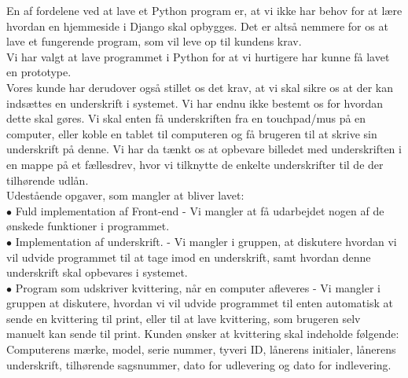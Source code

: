 \documentclass[a4paper]{article}
\begin{document}
En af fordelene ved at lave et Python program er, at vi ikke har behov for at lære hvordan en hjemmeside i Django skal opbygges. Det er altså nemmere for os at lave et fungerende program, som vil leve op til kundens krav. \\
Vi har valgt at lave programmet i Python for at vi hurtigere har kunne få lavet en prototype. \\
Vores kunde har derudover også stillet os det krav, at vi skal sikre os at der kan indsættes en underskrift i systemet. Vi har endnu ikke bestemt os for hvordan dette skal gøres. Vi skal enten få underskriften fra en touchpad/mus på en computer, eller koble en tablet til computeren og få brugeren til at skrive sin underskrift på denne. Vi har da tænkt os at opbevare billedet med underskriften i en mappe på et fællesdrev, hvor vi tilknytte de enkelte underskrifter til de der tilhørende udlån. \\[0.1in]
Udestående opgaver, som mangler at bliver lavet: \\
$\bullet$ Fuld implementation af Front-end - Vi mangler at få udarbejdet nogen af de ønskede funktioner i programmet. \\
$\bullet$ Implementation af underskrift. - Vi mangler i gruppen, at diskutere hvordan vi vil udvide programmet til at tage imod en underskrift, samt hvordan denne underskrift skal opbevares i systemet.\\
$\bullet$ Program som udskriver kvittering, når en computer afleveres - Vi mangler i gruppen at diskutere, hvordan vi vil udvide programmet til enten automatisk at sende en kvittering til print, eller til at lave kvittering, som brugeren selv manuelt kan sende til print. Kunden ønsker at kvittering skal indeholde følgende: Computerens mærke, model, serie nummer, tyveri ID, lånerens initialer, lånerens underskrift, tilhørende sagsnummer, dato for udlevering og dato for indlevering.
\end{document}
